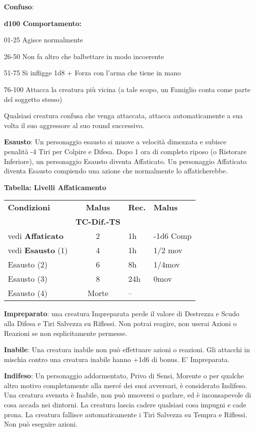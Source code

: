 \documentclass[a4paper,12 pt,openany]{book}
\begin{document}
\begin{textblock*}{19 cm}
\begin{multicols}{2}
\textbf{Confuso}: 

\textbf{d100 Comportamento:}

01-25 Agisce normalmente

26-50 Non fa altro che balbettare in modo incoerente

51-75 Si infligge 1d8 + Forza con l'arma che tiene in mano

76-100 Attacca la creatura più vicina (a tale scopo, un Famiglio conta come parte del soggetto stesso)

Qualsiasi creatura confusa che venga attaccata, attacca automaticamente a sua volta il suo aggressore al suo round successivo.

\textbf{Esausto}: Un personaggio esausto si muove a velocità dimezzata e subisce penalità -4 Tiri per Colpire e Difesa. Dopo 1 ora di completo riposo (o Ristorare Inferiore), un personaggio Esausto diventa Affaticato. Un personaggio Affaticato diventa Esausto compiendo una azione che normalmente lo affaticherebbe.

\medskip

\textbf{Tabella: Livelli Affaticamento}

\medskip

\begin{tabularx}{0.45\textwidth}{lcll}
	\textbf{Condizioni}& \textbf{Malus}&\textbf{Rec.}&\textbf{Malus}\\
	&\textbf{TC-Dif.-TS}&&\\
	\hline
	vedi \textbf{Affaticato}&2&1h&-1d6 Comp\\
	vedi \textbf{Esausto} (1)&4&1h&1/2 mov\\
	Esausto (2) &6&8h&1/4mov\\
	Esausto (3) &8&24h&0mov\\
	Esausto (4) &Morte&--&\\
\end{tabularx}

\textbf{Impreparato}: una creatura Impreparata perde il valore di Destrezza e Scudo alla Difesa e Tiri Salvezza su Riflessi. Non potrai reagire, non userai Azioni o Reazioni se non esplicitamente permesse.

\textbf{Inabile}: Una creatura inabile non può effettuare azioni o reazioni. Gli attacchi in mischia contro una creatura inabile hanno +1d6 di bonus. E' Impreparata.

\textbf{Indifeso}: Un personaggio addormentato, Privo di Sensi, Morente o per qualche altro motivo completamente alla mercé dei suoi avversari, è considerato Indifeso.
Una creatura svenuta è Inabile, non può muoversi o parlare, ed è inconsapevole di cosa accada nei dintorni. La creatura lascia cadere qualsiasi cosa impugni e cade prona. La creatura fallisce automaticamente i Tiri Salvezza su Tempra e Riflessi. Non può eseguire azioni.


\end{multicols}
\end{textblock*}
\end{document}
